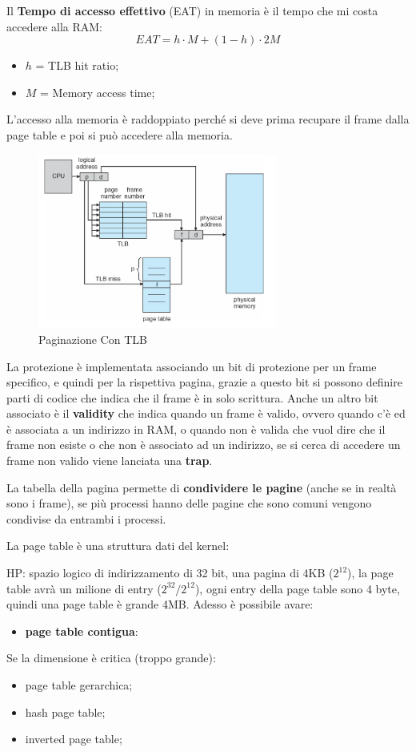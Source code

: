 \documentclass[12pt]{article}
\begin{document}
Il \textbf{Tempo di accesso effettivo} (EAT) in memoria \`e il tempo che mi costa accedere alla RAM:
\[ EAT = h \cdot M + (1 - h) \cdot 2M  \]
\begin{itemize}
  \item $h$ = TLB hit ratio;
  \item $M$ = Memory access time;
\end{itemize}
L'accesso alla memoria \`e raddoppiato perch\'e si deve prima recupare il frame dalla page table e poi si pu\`o accedere alla memoria.
\begin{figure}[H]
  \centering
  \includegraphics[width=0.7\textwidth]{paginazione-con-tlb.png}
  \caption{Paginazione Con TLB}
  \label{fig:paginazione-con-tlb}
\end{figure}
La protezione \`e implementata associando un bit di protezione per un frame specifico, e quindi per la rispettiva pagina, grazie a questo bit si possono definire parti di codice che indica che il frame \`e in solo scrittura. Anche un altro bit associato \`e il \textbf{validity} che indica quando un frame \`e valido, ovvero quando c'\`e ed \`e associata a un indirizzo in RAM, o quando non \`e valida che vuol dire che il frame non esiste o che non \`e associato ad un indirizzo, se si cerca di accedere un frame non valido viene lanciata una \textbf{trap}.

La tabella della pagina permette di \textbf{condividere le pagine} (anche se in realt\`a sono i frame), se pi\`u processi hanno delle pagine che sono comuni vengono condivise da entrambi i processi.

La page table \`e una struttura dati del kernel:
\begin{example}{}{}
  HP: spazio logico di indirizzamento di 32 bit, una pagina di 4KB ($2^{12}$), la page table avr\`a un milione di entry ($2^{32}/2^{12}$), ogni entry della page table sono 4 byte, quindi una page table \`e grande 4MB. Adesso \`e possibile avare:
  \begin{itemize}
    \item \textbf{page table contigua}:
  \end{itemize}
  Se la dimensione \`e critica (troppo grande):
    \begin{itemize}
      \item page table gerarchica;
      \item hash page table;
      \item inverted page table;
    \end{itemize}
\end{example}
\end{document}
